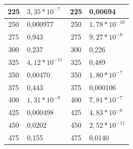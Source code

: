 \documentclass[a4paper,twoside,openright,12pt,slovene]{book}
\begin{document}
\begin{longtable}{| p{} | p{} | p{} | p{} |}
\multicolumn{1}{|c|}{225}                  & \color[HTML]{3531FF}$3,35*10^{-7}$                     & \multicolumn{1}{c|}{225}                  & \color[HTML]{3531FF}0,00694                          \\ \hline
\multicolumn{1}{|c|}{250}                  & \color[HTML]{3531FF}0,000977                         & \multicolumn{1}{c|}{250}                  & \color[HTML]{3531FF}$1,78*10^{-10}$                    \\ \hline
\multicolumn{1}{|c|}{275}                  & \cellcolor{lime}0,943                            & \multicolumn{1}{c|}{275}                  & \color[HTML]{3531FF}$9,27*10^{-8}$                     \\ \hline
\multicolumn{1}{|c|}{300}                  & \cellcolor{lime}0,237                            & \multicolumn{1}{c|}{300}                  & \cellcolor{lime}0,226                            \\ \hline
\multicolumn{1}{|c|}{325}                  & \color[HTML]{036400}$4,12*10^{-11}$                    & \multicolumn{1}{c|}{325}                  & \cellcolor{lime}0,489                            \\ \hline
\multicolumn{1}{|c|}{350}                  & \color[HTML]{036400}0,00470                          & \multicolumn{1}{c|}{350}                  & \color[HTML]{036400}$1,80*10^{-7}$                     \\ \hline
\multicolumn{1}{|c|}{375}                  & \cellcolor{lime}0,443                            & \multicolumn{1}{c|}{375}                  & \color[HTML]{036400}0,000106                         \\ \hline
\multicolumn{1}{|c|}{400}                  & \color[HTML]{036400}$1,31*10^{-8}$                     & \multicolumn{1}{c|}{400}                  & \color[HTML]{036400}$7,81*10^{-7}$                      \\ \hline
\multicolumn{1}{|c|}{425}                  & \color[HTML]{036400}0,000498                         & \multicolumn{1}{c|}{425}                  & \color[HTML]{036400}$4,83*10^{-6}$                       \\ \hline
\multicolumn{1}{|c|}{450}                  & \color[HTML]{036400}0,0202                           & \multicolumn{1}{c|}{450}                  & \color[HTML]{036400}$2,52*10^{-11}$                     \\ \hline
\multicolumn{1}{|c|}{475}                  & \cellcolor{lime}0,155                            & \multicolumn{1}{c|}{475}                  & \color[HTML]{036400}0,0140                           \\ \hline

\end{longtable}
\end{document}
